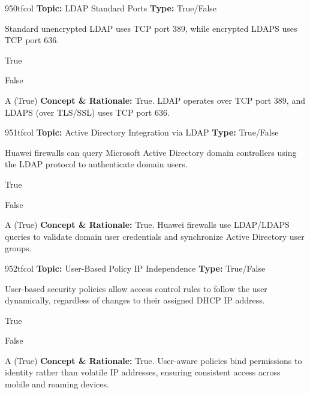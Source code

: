 \begin{qcard}{950}{tfcol}
\textcolor{darkslate!75}{\small\textbf{Topic:} LDAP Standard Ports \hfill \textbf{Type:} True/False}\vspace{0.4em}\par
Standard unencrypted LDAP uses TCP port 389, while encrypted LDAPS uses TCP port 636.
\begin{qoptions}
\item True
\item False
\end{qoptions}
\end{qcard}
\nopagebreak
\begin{explainbox}{A (True)}
\textbf{Concept \& Rationale:} True. LDAP operates over TCP port 389, and LDAPS (over TLS/SSL) uses TCP port 636.
\end{explainbox}

\begin{qcard}{951}{tfcol}
\textcolor{darkslate!75}{\small\textbf{Topic:} Active Directory Integration via LDAP \hfill \textbf{Type:} True/False}\vspace{0.4em}\par
Huawei firewalls can query Microsoft Active Directory domain controllers using the LDAP protocol to authenticate domain users.
\begin{qoptions}
\item True
\item False
\end{qoptions}
\end{qcard}
\nopagebreak
\begin{explainbox}{A (True)}
\textbf{Concept \& Rationale:} True. Huawei firewalls use LDAP/LDAPS queries to validate domain user credentials and synchronize Active Directory user groups.
\end{explainbox}

\begin{qcard}{952}{tfcol}
\textcolor{darkslate!75}{\small\textbf{Topic:} User-Based Policy IP Independence \hfill \textbf{Type:} True/False}\vspace{0.4em}\par
User-based security policies allow access control rules to follow the user dynamically, regardless of changes to their assigned DHCP IP address.
\begin{qoptions}
\item True
\item False
\end{qoptions}
\end{qcard}
\nopagebreak
\begin{explainbox}{A (True)}
\textbf{Concept \& Rationale:} True. User-aware policies bind permissions to identity rather than volatile IP addresses, ensuring consistent access across mobile and roaming devices.
\end{explainbox}

